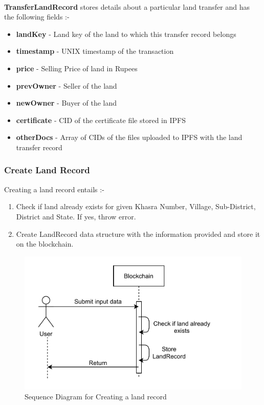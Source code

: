 \documentclass{article}
\begin{document}
        \paragraph{}
        \textbf{TransferLandRecord} stores details about a particular land transfer and has the following fields :-
        \begin{itemize}
            \item \textbf{landKey} - Land key of the land to which this transfer record belongs
            \item \textbf{timestamp} - UNIX timestamp of the transaction
            \item \textbf{price} - Selling Price of land in Rupees
            \item \textbf{prevOwner} - Seller of the land
            \item \textbf{newOwner} - Buyer of the land
            \item \textbf{certificate} - CID of the certificate file stored in IPFS
            \item \textbf{otherDocs} - Array of CIDs of the files uploaded to IPFS with the land transfer record
        \end{itemize}

    \subsubsection{Create Land Record}
        Creating a land record entails :-
        \begin{enumerate}
            \item Check if land already exists for given Khasra Number, Village, Sub-District, District and State. If yes, throw error.
            \item Create LandRecord data structure with the information provided and store it on the blockchain.
        \end{enumerate}

        \begin{figure}[htbp]
            \includegraphics[scale=0.25]{blockchain_seq_create_land}
            \centering
            \caption{Sequence Diagram for Creating a land record}
        \end{figure}
\end{document}
